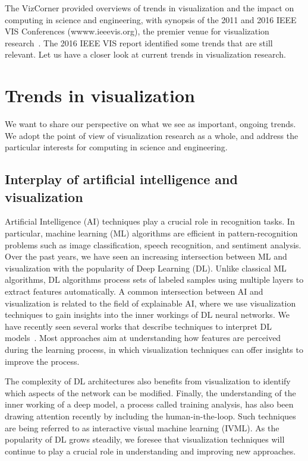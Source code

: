 \documentclass[10pt,journal,compsoc]{IEEEtran}
\begin{document}
The VizCorner provided overviews of trends in visualization and the impact on computing in science and engineering, with synopsis of the 2011 and 2016 IEEE VIS Conferences (wwww.ieeevis.org), the premier venue for visualization research~\cite{Scheidegger2011,Comba2017}. The 2016 IEEE VIS report identified some trends that are still relevant. Let us have a closer look at current trends in visualization research.


\section{Trends in visualization}

We want to share our perspective on what we see as important, ongoing trends. We adopt the point of view of visualization research as a whole, and address the particular interests for computing in science and engineering.

\subsection*{Interplay of artificial intelligence and visualization}

Artificial Intelligence (AI) techniques play a crucial role in recognition tasks. In particular, machine learning (ML) algorithms are efficient in pattern-recognition problems such as image classification, speech recognition, and sentiment analysis. Over the past years, we have seen an increasing intersection between ML and visualization with the popularity of Deep Learning (DL). Unlike classical ML algorithms, DL algorithms process sets of labeled samples using multiple layers to extract features automatically.
A common intersection between AI and visualization is related to the field of explainable AI, where we use visualization techniques to gain insights into the inner workings of DL neural networks. We have recently seen several works that describe techniques to interpret DL models~\cite{hohman2018visual,GARCIA2018}. Most approaches aim at understanding how features are perceived during the learning process, in which visualization techniques can offer insights to improve the process.

The complexity of DL architectures also benefits from visualization to identify which aspects of the network can be modified. Finally, the understanding of the inner working of a deep model, a process called training analysis, has also been drawing attention recently by including the human-in-the-loop. Such techniques are being referred to as interactive visual machine learning (IVML). As the popularity of DL grows steadily, we foresee that visualization techniques will continue to play a crucial role in understanding and improving new approaches. 
\end{document}
